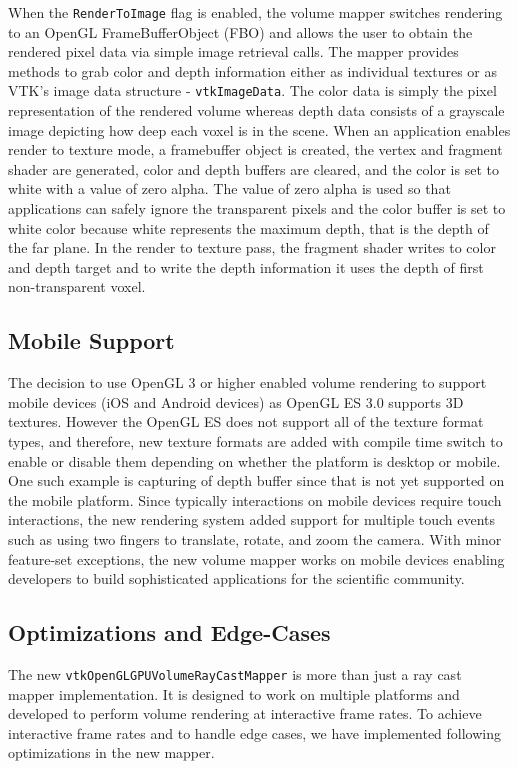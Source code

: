 When the \texttt{RenderToImage} flag is enabled, the volume mapper switches
rendering to an OpenGL FrameBufferObject (FBO) and allows the user to obtain the
rendered pixel data via simple image retrieval calls. The mapper provides
methods to grab color and depth information either as individual textures or as
VTK's image data structure - \texttt{vtkImageData}. The color data is simply the
pixel representation of the rendered volume whereas depth data consists of a
grayscale image depicting how deep each voxel is in the scene. When an
application enables render to texture mode, a framebuffer object is created, the
vertex and fragment shader are generated, color and depth buffers are cleared,
and the color is set to white with a value of zero alpha. The value of zero
alpha is used so that applications can safely ignore the transparent pixels and
the color buffer is set to white color because white represents the maximum
depth, that is the depth of the far plane. In the render to texture pass, the
fragment shader writes to color and depth target and to write the depth
information it uses the depth of first non-transparent voxel.

\subsection{Mobile Support}
The decision to use OpenGL 3 or higher enabled volume rendering to support
mobile devices (iOS and Android devices) as OpenGL ES 3.0 supports 3D textures.
However the OpenGL ES does not support all of the texture format types, and
therefore, new texture formats are added with compile time switch to enable or
disable them depending on whether the platform is desktop or mobile. One such
example is capturing of depth buffer since that is not yet supported on the
mobile platform.  Since typically interactions on mobile devices require touch
interactions, the new rendering system added support for multiple touch events
such as using two fingers to translate, rotate, and zoom the camera. With minor
feature-set exceptions, the new volume mapper works on mobile devices enabling
developers to build sophisticated applications for the scientific community.

\subsection{Optimizations and Edge-Cases} The new
\texttt{vtkOpenGLGPUVolumeRayCastMapper} is more than just a ray cast mapper
implementation. It is designed to work on multiple platforms and developed to
perform volume rendering at interactive frame rates. To achieve interactive
frame rates and to handle edge cases, we have implemented following
optimizations in the new mapper. 

